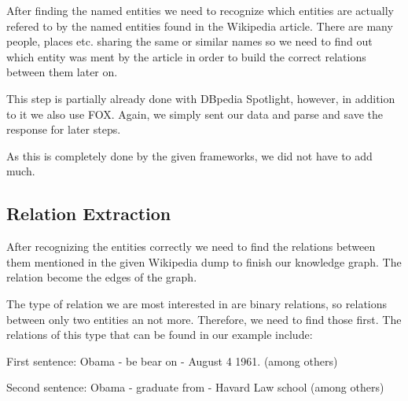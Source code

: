 \documentclass[runningheads]{llncs}
\begin{document}
After finding the named entities we need to recognize which entities are actually refered to by the named entities found in the Wikipedia article. There are many people, places etc. sharing the same or similar names so we need to find out which entity was ment by the article in order to build the correct relations between them later on.

This step is partially already done with DBpedia Spotlight, however, in addition to it we also use FOX. Again, we simply sent our data and parse and save the response for later steps. 

As this is completely done by the given frameworks, we did not have to add much.

\subsection{Relation Extraction}

After recognizing the entities correctly we need to find the relations between them mentioned in the given Wikipedia dump to finish our knowledge graph. The relation become the edges of the graph.

The type of relation we are most interested in are binary relations, so relations between only two entities an not more. Therefore, we need to find those first. The relations of this type that can be found in our example include:
\begin{example}
First sentence: Obama - be bear on - August 4 1961. (among others)

Second sentence: Obama - graduate from - Havard Law school (among others)\end{example}
\end{document}
